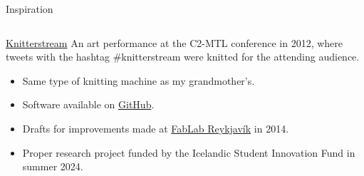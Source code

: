 \documentclass[
    NAME={Dr. Helga Ingimundardóttir},
    EMAIL={helgaingim@hi.is},
    FACULTY={Industrial Engineering},
    TITLE={HiDef Textiles: Reviving Tradition with Innovation},
    SUBTITLE={Empowering Creativity and Sustainability in Textile Production through Digital Transformation},
    SEMINAR={Reykjavík DataBeers},
    DATE={January 25, 2025},
    WIDE={true}
]{HI-LaTeX/hi-beamer}
\begin{document}
    \begin{frame}{Inspiration}

        \begin{columns}
            \begin{column}{0.65\textwidth}
                \begin{alertblock}{\href{https://vimeo.com/58580261}{Knitterstream}}
                    An art performance at the \alert{C2-MTL} conference in 2012, where tweets with the hashtag \alert{\#knitterstream} were knitted for the attending audience.
                \end{alertblock}

                \begin{itemize}
                    \item Same type of knitting machine as my grandmother's.
                    \item Software available on \href{https://github.com/borgstrom/KnitterStream/tree/master}{GitHub}.
                    \item Drafts for improvements made at \href{https://web.archive.org/web/20150918225135/http://wiki.fablab.is/wiki/HiKnitterStream}{FabLab Reykjavík} in 2014.
                    \item Proper research project funded by the \alert{Icelandic Student Innovation Fund} in summer 2024.
                \end{itemize}


\end{column}
\end{columns}
\end{frame}
\end{document}

